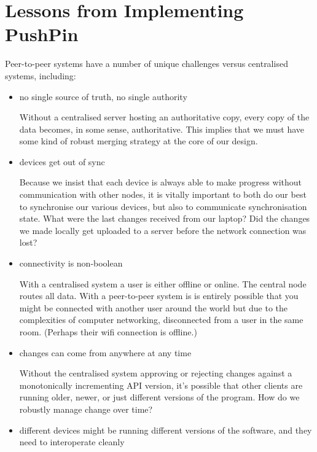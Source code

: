 \documentclass[sigplan,10pt]{acmart}
\begin{document}
\section{Lessons from Implementing PushPin}\label{sec:lessons}


Peer-to-peer systems have a number of unique challenges versus centralised systems, including:

\begin{itemize}
	\item no single source of truth, no single authority

	Without a centralised server hosting an authoritative copy, every copy of the data becomes, in some sense, authoritative. This implies that we must have some kind of robust merging strategy at the core of our design.
	\item devices get out of sync

    Because we insist that each device is always able to make progress without communication with other nodes, it is vitally important to both do our best to synchronise our various devices, but also to communicate synchronisation state. What were the last changes received from our laptop? Did the changes we made locally get uploaded to a server before the network connection was lost?  

    \item connectivity is non-boolean

    With a centralised system a user is either offline or online. The central node routes all data. With a peer-to-peer system is is entirely possible that you might be connected with another user around the world but due to the complexities of computer networking, disconnected from a user in the same room. (Perhaps their wifi connection is offline.) 

    \item changes can come from anywhere at any time

    Without the centralised system approving or rejecting changes against a monotonically incrementing API version, it's possible that other clients are running older, newer, or just different versions of the program. How do we robustly manage change over time?
    
    \item different devices might be running different versions of the software, and they need to interoperate cleanly
\end{itemize}
\end{document}
